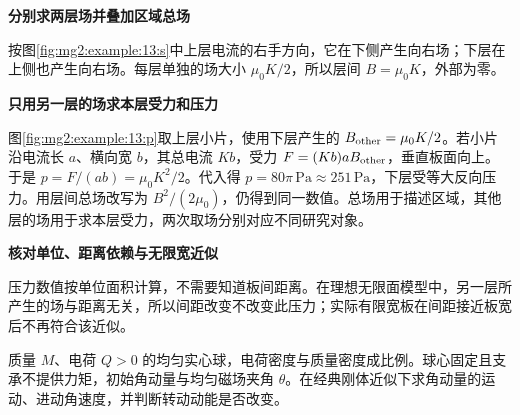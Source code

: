 \begin{solution}\textbf{分别求两层场并叠加区域总场}\par\nobreak
按图\ref{fig:mg2:example:13:s}中上层电流的右手方向，它在下侧产生向右场；下层在上侧也产生向右场。每层单独的场大小 $\mu_0K/2$，所以层间 $B=\mu_0K$，外部为零。



\par\medskip{}\noindent\textbf{只用另一层的场求本层受力和压力}\par\nobreak
图\ref{fig:mg2:example:13:p}取上层小片，使用下层产生的 $B_{\rm other}=\mu_0K/2$。若小片沿电流长 $a$、横向宽 $b$，其总电流 $Kb$，受力 $F=(Kb)aB_{\rm other}$，垂直板面向上。于是 $p=F/(ab)=\mu_0K^2/2$。代入得 $p=80\pi\,\mathrm{Pa}\approx251\,\mathrm{Pa}$，下层受等大反向压力。用层间总场改写为 $B^2/(2\mu_0)$，仍得到同一数值。总场用于描述区域，其他层的场用于求本层受力，两次取场分别对应不同研究对象。



\par\medskip{}\noindent\textbf{核对单位、距离依赖与无限宽近似}\par\nobreak
压力数值按单位面积计算，不需要知道板间距离。在理想无限面模型中，另一层所产生的场与距离无关，所以间距改变不改变此压力；实际有限宽板在间距接近板宽后不再符合该近似。\end{solution}
\begin{question}\begin{example}[均匀带电球的磁进动]\label{mg2:example:14}
质量 $M$、电荷 $Q>0$ 的均匀实心球，电荷密度与质量密度成比例。球心固定且支承不提供力矩，初始角动量与均匀磁场夹角 $\theta$。在经典刚体近似下求角动量的运动、进动角速度，并判断转动动能是否改变。
\end{example}
\end{question}
